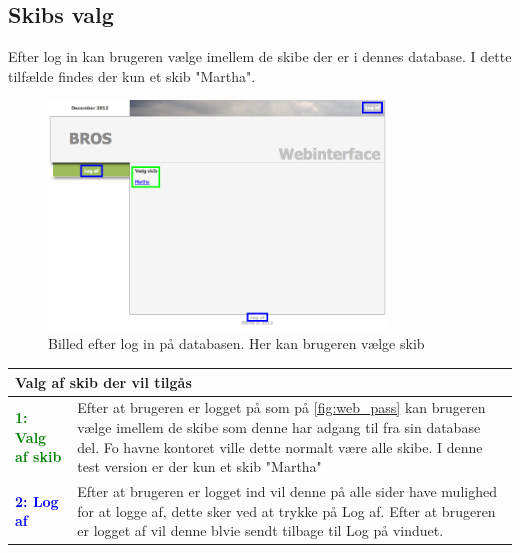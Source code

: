 \subsection*{Skibs valg}
Efter log in kan brugeren vælge imellem de skibe der er i dennes database. I dette tilfælde findes der kun et skib "Martha".
\begin{figure}[H]
	\centering
	\includegraphics[width=0.8\textwidth]{billeder/database/web_ship_choice}
	\caption{Billed efter log in på databasen. Her kan brugeren vælge skib}
	\label{fig:web_ship_choice}
\end{figure}

\begin{table}[H]
\begin{tabular}{l p{12.5cm}}
\multicolumn{2}{l}{Valg af skib der vil tilgås } \\
\hline
\textcolor{green}{\textbf{1: Valg af skib}}
&Efter at brugeren er logget på som på \ref{fig:web_pass} kan brugeren vælge imellem de skibe som denne har adgang til fra sin database del. Fo havne kontoret ville dette normalt være alle skibe. I denne test version er der kun et skib "Martha"\\
\textcolor{blue}{\textbf{2: Log af}}
&Efter at brugeren er logget ind vil denne på alle sider have mulighed for at logge af, dette sker ved at trykke på Log af. Efter at brugeren er logget af vil denne blvie sendt tilbage til Log på vinduet.\\
\end{tabular}
\end{table}

